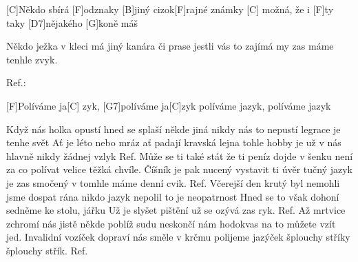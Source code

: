 
[C]Někdo sbírá [F]odznaky 
[B]jiný cizok[F]rajné známky 
[C] možná, že i [F]ty taky 
[D7]nějakého [G]koně máš

Někdo ježka v kleci má
jiný kanára či prase
jestli vás to zajímá
my zas máme tenhle zvyk.

Ref.:

[F]Políváme ja[C] zyk, [G7]políváme ja[C]zyk
políváme jazyk, políváme jazyk

Když nás holka opustí
hned se splaší někde jiná
nikdy nás to nepustí
legrace je tenhe svět
Ať je léto nebo mráz
ať padají kravská lejna
tohle hobby je už v nás
hlavně nikdy žádnej vzlyk
Ref.
\slpc
Může se ti také stát
že ti peníz dojde v šenku
není za co polívat
velice těžká chvíle.
Číšník je pak nucený
vystavit ti úvěr tučný
jazyk je zas smočený
v tomhle máme denní cvik.
Ref.
Včerejší den krutý byl
nemohli jsme dospat rána
nikdo jazyk nepolil
to je neopatrnost
Hned se to však dohoní
sedněme ke stolu, jářku
Už je slyšet pištění
už se ozývá zas ryk.
Ref.
Až mrtvice zchromí nás
jistě někde poblíž sudu
neskončí nám hodokvas
na to můžete vzít jed.
Invalidní vozíček dopraví nás směle v krčmu
polijeme jazýček
šplouchy stříky
šplouchy střík. 
Ref.